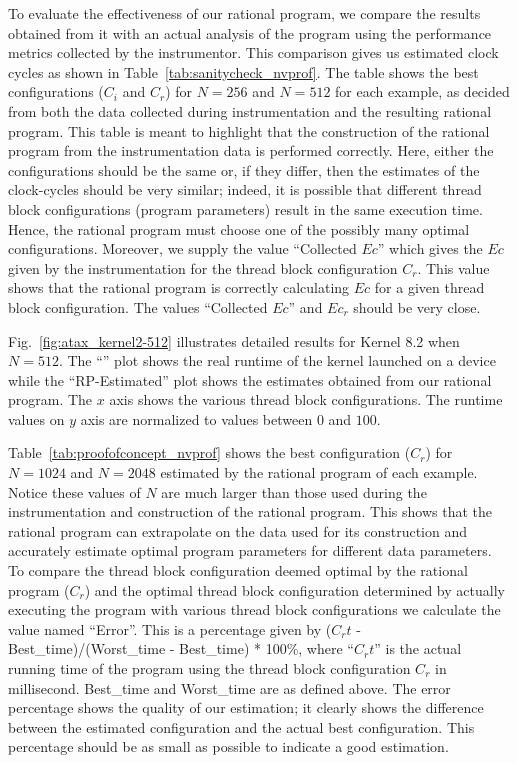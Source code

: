 To evaluate the effectiveness of our rational program, we compare 
the results obtained from it with an actual analysis of the program 
using the performance metrics collected by the instrumentor. 
This comparison gives us estimated clock cycles as shown in 
Table~\ref{tab:sanitycheck_nvprof}.
The table shows the best configurations ($C_i$ and
$C_r$) for $N = 256$ and $N = 512$ for each example, as decided from
both the data collected during instrumentation and the resulting rational
program.  This table is meant to highlight that the construction of
the rational program from the instrumentation data is performed
correctly. Here, either the configurations should be the same or, if
they differ, then the estimates of the clock-cycles should be very
similar; indeed, it is possible that different thread block
configurations (program parameters) result in the same execution
time. Hence, the rational program must choose one of the possibly many
optimal configurations. Moreover, we supply the value ``Collected
$Ec$'' which gives the $Ec$ given by the instrumentation for the thread
block configuration $C_r$.  This value shows that the rational program
is correctly calculating $Ec$ for a given thread block
configuration. The values ``Collected $Ec$'' and $Ec_r$ should be very
close.

Fig.~\ref{fig:atax_kernel2-512}
illustrates detailed results for Kernel 8.2 when $N = 512$. 
The ``\cuda'' plot shows the real runtime of the kernel launched
on a device while the ``RP-Estimated'' plot shows the estimates
obtained from our rational program.
The $x$ axis shows the various thread block configurations.
The runtime values on $y$ axis are normalized to values between 
$0$ and $100$.  

Table~\ref{tab:proofofconcept_nvprof} shows the best configuration ($C_r$)
for $N = 1024$ and $N = 2048$ estimated by the rational program of
each example.  Notice these values of $N$ are much larger than those
used during the instrumentation and construction of the rational
program. This shows that the rational program can extrapolate on the
data used for its construction and accurately estimate optimal program
parameters for different data parameters.  To compare the thread block
configuration deemed optimal by the rational program ($C_r$) and the
optimal thread block configuration determined by actually executing
the program with various thread block configurations we calculate the
value named ``Error''.  This is a  percentage  given
by ($C_rt$ - Best\_time)/(Worst\_time - Best\_time) *
100\%, where ``$C_rt$'' is the actual running time of the program
using the thread block configuration $C_r$ in millisecond. Best\_time  and Worst\_time
are as defined above.  The error percentage shows the
quality of our estimation; it clearly shows the difference between the
estimated configuration and the actual best configuration.  This
percentage should be as small as possible to indicate a good
estimation. 

